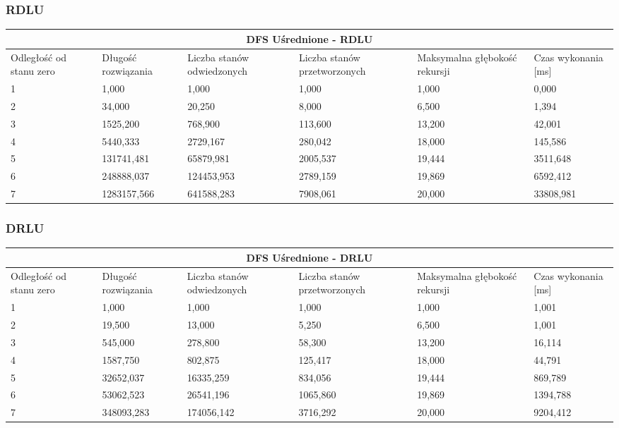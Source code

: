 \documentclass{classrep}
\begin{document}
{\subsubsection{RDLU}
\begin{center}
	\begin{tabular}{ | p{1.6cm} | p{2cm} | p{2cm} | p{2cm} | p{2.2cm} | p{2cm} | }
	\hline
	\multicolumn{6}{|c|}{DFS Uśrednione - RDLU} \\
	\hline
	Odległość od stanu zero & Długość rozwiązania & Liczba stanów odwiedzonych & Liczba stanów przetworzonych & Maksymalna głębokość rekursji & Czas wykonania [ms]\\
	\hline
	1 &1,000&1,000&1,000&1,000&0,000\\
	\hline
	2 &34,000&20,250&8,000&6,500&1,394\\
	\hline
	3 &1525,200&768,900&113,600&13,200&42,001\\
	\hline
	4 &5440,333&2729,167&280,042&18,000&145,586\\
	\hline
	5 &131741,481&65879,981&2005,537&19,444&3511,648\\
	\hline
	6 &248888,037&124453,953&2789,159&19,869&6592,412\\
	\hline
	7 &1283157,566&641588,283&7908,061&20,000&33808,981\\
	\hline
	\end{tabular}
\end{center}

\subsubsection{DRLU}
\begin{center}
	\begin{tabular}{ | p{1.6cm} | p{2cm} | p{2cm} | p{2cm} | p{2.2cm} | p{2cm} | }
	\hline
	\multicolumn{6}{|c|}{DFS Uśrednione - DRLU} \\
	\hline
	Odległość od stanu zero & Długość rozwiązania & Liczba stanów odwiedzonych & Liczba stanów przetworzonych & Maksymalna głębokość rekursji & Czas wykonania [ms]\\
	\hline
	1 &1,000&1,000&1,000&1,000&1,001\\
	\hline
	2 &19,500&13,000&5,250&6,500&1,001\\
	\hline
	3 &545,000&278,800&58,300&13,200&16,114\\
	\hline
	4 &1587,750&802,875&125,417&18,000&44,791\\
	\hline
	5 &32652,037&16335,259&834,056&19,444&869,789\\
	\hline
	6 &53062,523&26541,196&1065,860&19,869&1394,788\\
	\hline
	7 &348093,283&174056,142&3716,292&20,000&9204,412\\
	\hline
	\end{tabular}
\end{center}

}
\end{document}
